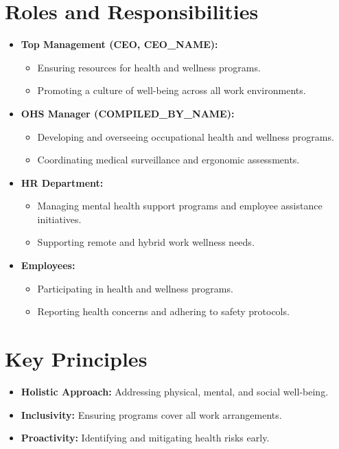 \documentclass[11pt]{article}
\newcommand{\compilerName}{{{COMPILED_BY_NAME}}}
\begin{document}
\section{Roles and Responsibilities}
\begin{itemize}
    \item \textbf{Top Management (CEO, {{CEO_NAME}}):}
    \begin{itemize}
        \item Ensuring resources for health and wellness programs.
        \item Promoting a culture of well-being across all work environments.
    \end{itemize}
    \item \textbf{OHS Manager (\compilerName):}
    \begin{itemize}
        \item Developing and overseeing occupational health and wellness programs.
        \item Coordinating medical surveillance and ergonomic assessments.
    \end{itemize}
    \item \textbf{HR Department:}
    \begin{itemize}
        \item Managing mental health support programs and employee assistance initiatives.
        \item Supporting remote and hybrid work wellness needs.
    \end{itemize}
    \item \textbf{Employees:}
    \begin{itemize}
        \item Participating in health and wellness programs.
        \item Reporting health concerns and adhering to safety protocols.
    \end{itemize}
\end{itemize}

\section{Key Principles}
\begin{itemize}
    \item \textbf{Holistic Approach:} Addressing physical, mental, and social well-being.
    \item \textbf{Inclusivity:} Ensuring programs cover all work arrangements.
    \item \textbf{Proactivity:} Identifying and mitigating health risks early.
\end{itemize}
\end{document}
